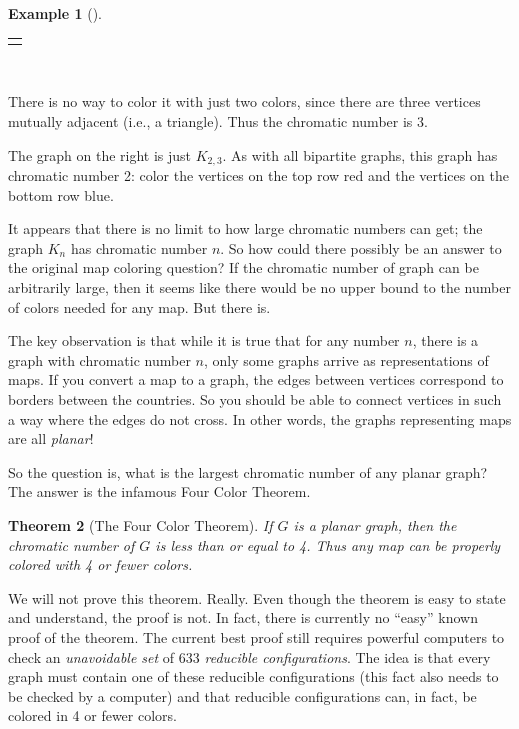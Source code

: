 \documentclass[10pt,]{book}
\theoremstyle{plain}
\newtheorem{theorem}{Theorem}[section]
\theoremstyle{definition}
\theoremstyle{definition}
\newtheorem{example}[theorem]{Example}
\theoremstyle{definition}
\numberwithin{equation}{chapter}
\newlength{\panelmax}
\begin{document}
\begin{example}[]
{\begin{tabular}{@{}*{1}{c}@{}}
\begin{minipage}[c][\panelmax][t]{0.25\linewidth}\usebox{\panelboxAimage}\end{minipage}\end{tabular}\\
}%
\par
\hypertarget{p-341}{}%
There is no way to color it with just two colors, since there are three vertices mutually adjacent (i.e., a triangle). Thus the chromatic number is 3.%
\par
\hypertarget{p-342}{}%
The graph on the right is just \(K_{2,3}\). As with all bipartite graphs, this graph has chromatic number 2: color the vertices on the top row red and the vertices on the bottom row blue.%
\end{example}
\hypertarget{p-343}{}%
It appears that there is no limit to how large chromatic numbers can get; the graph \(K_n\) has chromatic number \(n\). So how could there possibly be an answer to the original map coloring question? If the chromatic number of graph can be arbitrarily large, then it seems like there would be no upper bound to the number of colors needed for any map. But there is.%
\par
\hypertarget{p-344}{}%
The key observation is that while it is true that for any number \(n\), there is a graph with chromatic number \(n\), only some graphs arrive as representations of maps. If you convert a map to a graph, the edges between vertices correspond to borders between the countries. So you should be able to connect vertices in such a way where the edges do not cross. In other words, the graphs representing maps are all \emph{planar}!%
\par
\hypertarget{p-345}{}%
So the question is, what is the largest chromatic number of any planar graph? The answer is the infamous Four Color Theorem.%
\begin{theorem}[{The Four Color Theorem}]\label{theorem-5}
\hypertarget{p-346}{}%
 If \(G\) is a planar graph, then the chromatic number of \(G\) is less than or equal to 4. Thus any map can be properly colored with 4 or fewer colors.%
\end{theorem}
\hypertarget{p-347}{}%
We will not prove this theorem. Really. Even though the theorem is easy to state and understand, the proof is not. In fact, there is currently no ``easy'' known proof of the theorem. The current best proof still requires powerful computers to check an \emph{unavoidable set} of 633 \emph{reducible configurations}. The idea is that every graph must contain one of these reducible configurations (this fact also needs to be checked by a computer) and that reducible configurations can, in fact, be colored in 4 or fewer colors.%
\end{document}
